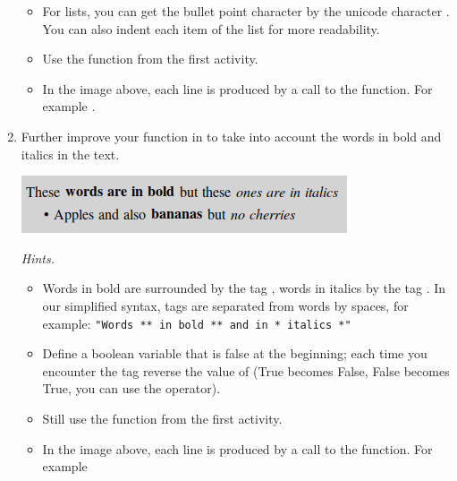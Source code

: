 \documentclass[11pt,class=report,crop=false]{standalone}
\begin{document}
\begin{activite}
\begin{enumerate}
\begin{itemize}
    \item For lists, you can get the bullet point character \og{}\textbullet\fg{} by the unicode character . You can also indent each item of the list for more readability.
    
    \item Use the  function from the first activity.
    
    \item In the image above, each line is produced by a call to the function. For example .
   \end{itemize}


  \item Further improve your function in  to take into account the words in bold and italics in the text.
  
\begin{center}
\includegraphics[scale=0.7]{screen-markdown-5-en}
\end{center}   
 
 	\emph{Hints.}
  \begin{itemize}
    \item Words in bold are surrounded by the tag \ci{**}, words in italics by the tag \ci{*}. In our simplified syntax, tags are separated from words by spaces, for example: \lstinline!"Words ** in bold ** and in * italics *"!
    
    
    \item Define a boolean variable  that is false at the beginning; each time you encounter the tag \ci{**} reverse the value of  (\og{}True\fg{} becomes \og{}False\fg{}, \og{}False\fg{} becomes \og{}True\fg{}, you can use the  operator).
    
    \item Still use the  function from the first activity.
    
    \item In the image above, each line is produced by a call to the function. For example 
   \end{itemize} 
   

\end{enumerate}
\end{activite}
\end{document}

